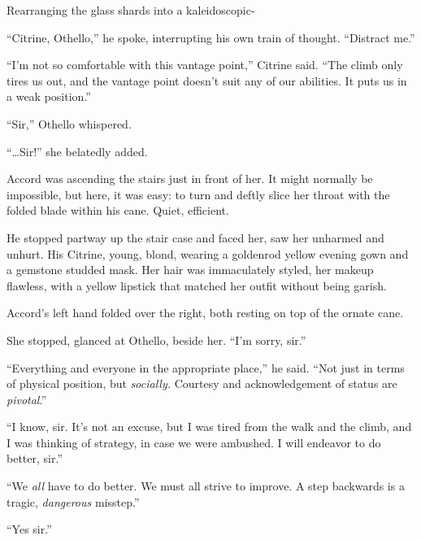 Rearranging the glass shards into a kaleidoscopic-



``Citrine, Othello,'' he spoke, interrupting his own train of thought.  ``Distract me.''



``I'm not so comfortable with this vantage point,'' Citrine said.  ``The climb only tires us out, and the vantage point doesn't suit any of our abilities.  It puts us in a weak position.''



``Sir,'' Othello whispered.



``\ldots{}Sir!'' she belatedly added.



Accord was ascending the stairs just in front of her.  It might normally be impossible, but here, it was easy: to turn and deftly slice her throat with the folded blade within his cane.  Quiet, efficient.



He stopped partway up the stair case and faced her, saw her unharmed and unhurt.  His Citrine, young, blond, wearing a goldenrod yellow evening gown and a gemstone studded mask.  Her hair was immaculately styled, her makeup flawless, with a yellow lipstick that matched her outfit without being garish.



Accord's left hand folded over the right, both resting on top of the ornate cane.



She stopped, glanced at Othello, beside her.  ``I'm sorry, sir.''



``Everything and everyone in the appropriate place,'' he said.  ``Not just in terms of physical position, but \emph{socially.  }Courtesy and acknowledgement of status are \emph{pivotal}.''



``I know, sir.  It's not an excuse, but I was tired from the walk and the climb, and I was thinking of strategy, in case we were ambushed.  I will endeavor to do better, sir.''



``We \emph{all} have to do better.  We must all strive to improve.  A step backwards is a tragic, \emph{dangerous} misstep.''



``Yes sir.''



